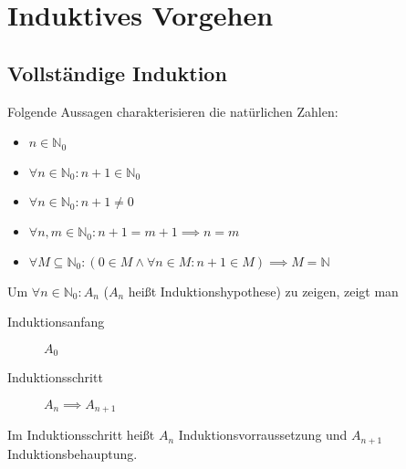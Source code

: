 \chapter{Induktives Vorgehen}

\section{Vollständige Induktion}
\begin{definition}
  Folgende Aussagen charakterisieren die natürlichen Zahlen:
  \begin{itemize}
  \item $n \in \mathbb{N}_0$
  \item $\forall n \in \mathbb{N}_0: n+1 \in \mathbb{N}_0$
  \item $\forall n \in \mathbb{N}_0: n + 1 \ne 0$
  \item $\forall n, m \in \mathbb{N}_0: n+1 = m+1 \implies n = m$
  \item $\forall M \subseteq \mathbb{N}_0: (0 \in M \wedge \forall n \in M: n+1 \in M) \implies M = \mathbb{N}$
  \end{itemize}
\end{definition}

\begin{definition}
  Um $\forall n \in \mathbb{N}_0: A_n$ ($A_n$ heißt Induktionshypothese) zu zeigen, zeigt man
  \begin{description}
  \item[Induktionsanfang] $A_0$
  \item[Induktionsschritt] $A_n \implies A_{n+1}$
  \end{description}

  Im Induktionsschritt heißt $A_n$ Induktionsvorraussetzung und $A_{n+1}$ Induktionsbehauptung.

  \begin{prooftree}
  \end{prooftree}
\end{definition}